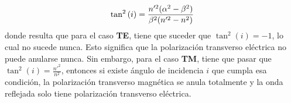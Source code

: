 \begin{equation*}
    \tan^{2}{(i)} =
    \frac%
    {%
        n'^{2}(\alpha^{2} - \beta^{2})
    }
    {%
        \beta^{2}(n'^{2}-n^{2})
    }
\end{equation*}
donde resulta que para el caso \textbf{TE}, tiene que suceder que $\tan^{2}{(i)} = -1$, lo cual no sucede nunca. Esto significa que la polarización transverso eléctrica no puede anularse nunca. Sin embargo, para el caso \textbf{TM}, tiene que pasar que $\tan^{2}(i) = \frac{n'^{2}}{n^{2}}$, entonces si existe ángulo de incidencia $i$ que cumpla esa condición, la polarización transverso magnética se anula totalmente y la onda reflejada solo tiene polarización transverso eléctrica.





